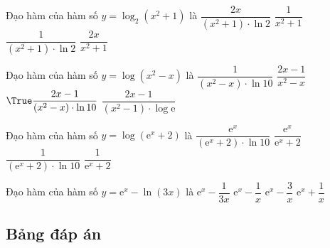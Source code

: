 \begin{ex}%
	Đạo hàm của hàm số $y=\log_2\left(x^2+1\right)$ là
	\choice
	{\True $\dfrac{2x}{\left(x^2+1\right)\cdot\ln 2}$}
	{$\dfrac{1}{x^2+1}$}
	{$\dfrac{1}{\left(x^2+1\right)\cdot\ln 2}$}
	{$\dfrac{2x}{x^2+1}$}
\end{ex}

\begin{ex}%
	Đạo hàm của hàm số $y=\log\left(x^2-x\right)$ là
	\choice
	{$\dfrac{1}{\left(x^2-x\right)\cdot\ln 10}$}
	{$\dfrac{2x-1}{x^2-x}$}
	{$\True \dfrac{2x-1}{\left(x^2-x\right)\cdot\ln 10}$}
	{$\dfrac{2x-1}{\left(x^2-1\right)\cdot\log\mathrm{e}}$}
\end{ex}

\begin{ex}%
	Đạo hàm của hàm số $y=\log\left(\mathrm{e}^x+2\right)$ là
	\choice
	{\True $\dfrac{\mathrm{e}^x}{\left(\mathrm{e}^x+2\right)\cdot\ln 10}$}
	{$\dfrac{\mathrm{e}^x}{\mathrm{e}^x+2}$}
	{$\dfrac{1}{\left(\mathrm{e}^x+2\right)\cdot\ln 10}$}
	{$\dfrac{1}{\mathrm{e}^x+2}$}
\end{ex}

\begin{ex}%
	Đạo hàm của hàm số $y=\mathrm{e}^x-\ln \left(3x\right)$ là
	\choice
	{$\mathrm{e}^x-\dfrac{1}{3x}$}
	{\True $\mathrm{e}^x-\dfrac{1}{x}$}
	{$\mathrm{e}^x-\dfrac{3}{x}$}
	{$\mathrm{e}^x+\dfrac{1}{x}$}
\end{ex}
\subsection{Bảng đáp án}

